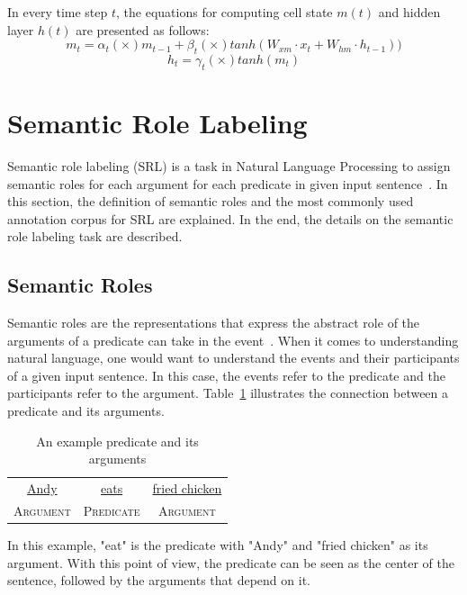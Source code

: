 In every time step $t$, the equations for computing cell state $m(t)$ and hidden layer $h(t)$ are presented as follows:
\begin{equation}\label{eq:mt}
m_{t}=\alpha_{t} (\times) m_{t-1} + \beta_{t} (\times) tanh(W_{xm} \cdot x_{t} + W_{hm} \cdot h_{t-1}))
\end{equation}
\begin{equation}\label{eq:ht}
h_{t}=\gamma_{t} (\times) tanh(m_{t})
\end{equation}

\section{Semantic Role Labeling}
Semantic role labeling (SRL) is a task in Natural Language Processing to assign semantic roles for each argument for each predicate in given input sentence~\citep{jurafsky2016speech}. In this section, the definition of semantic roles and the most commonly used annotation corpus for SRL are explained. In the end, the details on the semantic role labeling task are described.

\subsection{Semantic Roles}
Semantic roles are the representations that express the abstract role of the arguments of a predicate can take in the event~\citep{jurafsky2016speech}. When it comes to understanding natural language, one would want to understand the events and their participants of a given input sentence. In this case, the events refer to the predicate and the participants refer to the argument. Table~\ref{tab:examplesrl1} illustrates the connection between a predicate and its arguments.

\begin{table}
	\centering
	\caption{An example predicate and its arguments}
	\label{tab:examplesrl1}
	\begin{tabular}{|ccc|}
		\hline
		\underline{Andy} & \underline{eats} & \underline{fried chicken} \\
		\textsc{Argument} & \textsc{Predicate} & \textsc{Argument} \\
		\hline
	\end{tabular}
\end{table}

In this example, "eat" is the predicate with "Andy" and "fried chicken" as its argument. With this point of view, the predicate can be seen as the center of the sentence, followed by the arguments that depend on it.

